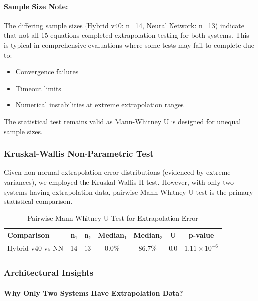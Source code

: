 \paragraph{Sample Size Note:}

The differing sample sizes (Hybrid v40: n=14, Neural Network: n=13) indicate that not all 15 equations completed extrapolation testing for both systems. This is typical in comprehensive evaluations where some tests may fail to complete due to:
\begin{itemize}
    \item Convergence failures
    \item Timeout limits
    \item Numerical instabilities at extreme extrapolation ranges
\end{itemize}

The statistical test remains valid as Mann-Whitney U is designed for unequal sample sizes.

\subsubsection{Kruskal-Wallis Non-Parametric Test}

Given non-normal extrapolation error distributions (evidenced by extreme variances), we employed the Kruskal-Wallis H-test. However, with only two systems having extrapolation data, pairwise Mann-Whitney U test is the primary statistical comparison.

\begin{table}[htbp]
\centering
\caption{Pairwise Mann-Whitney U Test for Extrapolation Error}
\label{tab:pairwise_tests}
\begin{tabular}{@{}lcccccc@{}}
\toprule
\textbf{Comparison} & \textbf{n₁} & \textbf{n₂} & \textbf{Median₁} & \textbf{Median₂} & \textbf{U} & \textbf{p-value} \\
\midrule
Hybrid v40 vs NN & 14 & 13 & 0.0\% & 86.7\% & 0.0 & $1.11 \times 10^{-6}$ \\
\bottomrule
\end{tabular}
\end{table}

\subsubsection{Architectural Insights}

\paragraph{Why Only Two Systems Have Extrapolation Data?}

